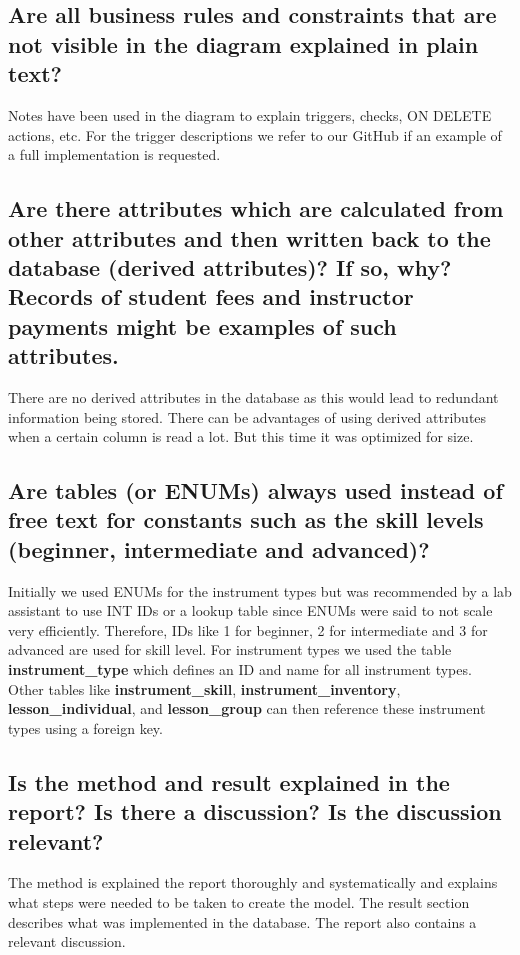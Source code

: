 \documentclass[a4paper]{scrartcl}
\begin{document}
\subsection{Are all business rules and constraints that are not visible in the diagram explained in plain text?}
Notes have been used in the diagram to explain triggers, checks, ON DELETE actions, etc. For the trigger descriptions we refer to our GitHub if an example of a full implementation is requested.

\subsection{Are there attributes which are calculated from other attributes and then written back to the database (derived attributes)? If so, why? Records of student fees and instructor payments might be examples of such attributes.}

There are no derived attributes in the database as this would lead to redundant information being stored. There can be advantages of using derived attributes when a certain column is read a lot. But this time it was optimized for size.

\subsection{Are tables (or ENUMs) always used instead of free text for constants such as the skill levels (beginner, intermediate and advanced)?}
Initially we used ENUMs for the instrument types but was recommended by a lab assistant to use INT IDs or a lookup table since ENUMs were said to not scale very efficiently. Therefore, IDs like 1 for beginner, 2 for intermediate and 3 for advanced are used for skill level. For instrument types we used the table \textbf{instrument\_type} which defines an ID and name for all instrument types. Other tables like \textbf{instrument\_skill}, \textbf{instrument\_inventory}, \textbf{lesson\_individual}, and \textbf{lesson\_group} can then reference these instrument types using a foreign key.

\subsection{Is the method and result explained in the report? Is there a discussion? Is the discussion relevant?}

The method is explained the report thoroughly and systematically and explains what steps were needed to be taken to create the model. The result section describes what was implemented in the database. The report also contains a relevant discussion.  
\end{document}
